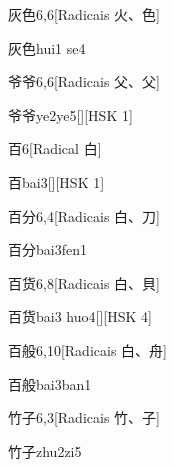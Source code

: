 \begin{entry}{灰色}{6,6}[Radicais ⽕、⾊]
  \begin{phonetics}{灰色}{hui1 se4}
  \end{phonetics}
\end{entry}

\begin{entry}{爷爷}{6,6}[Radicais ⽗、⽗]
  \begin{phonetics}{爷爷}{ye2ye5}[][HSK 1]
  \end{phonetics}
\end{entry}

\begin{entry}{百}{6}[Radical ⽩]
  \begin{phonetics}{百}{bai3}[][HSK 1]
  \end{phonetics}
\end{entry}

\begin{entry}{百分}{6,4}[Radicais ⽩、⼑]
  \begin{phonetics}{百分}{bai3fen1}
  \end{phonetics}
\end{entry}

\begin{entry}{百货}{6,8}[Radicais ⽩、⾙]
  \begin{phonetics}{百货}{bai3 huo4}[][HSK 4]
  \end{phonetics}
\end{entry}

\begin{entry}{百般}{6,10}[Radicais ⽩、⾈]
  \begin{phonetics}{百般}{bai3ban1}
  \end{phonetics}
\end{entry}

\begin{entry}{竹子}{6,3}[Radicais ⽵、⼦]
  \begin{phonetics}{竹子}{zhu2zi5}
  \end{phonetics}
\end{entry}

